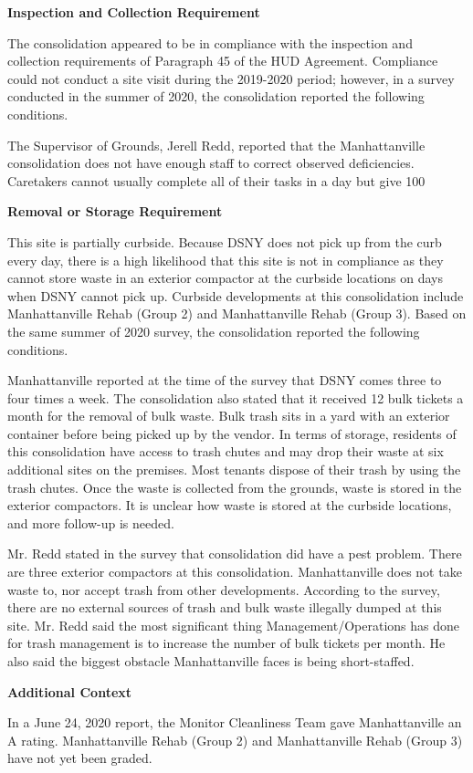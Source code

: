  

\textbf{Inspection and Collection Requirement} 

 

The consolidation appeared to be in compliance with the inspection and collection requirements of Paragraph 45 of the HUD Agreement. Compliance could not conduct a site visit during the 2019-2020 period; however, in a survey conducted in the summer of 2020, the consolidation reported the following conditions.

The Supervisor of Grounds, Jerell Redd, reported that the Manhattanville consolidation does not have enough staff to correct observed deficiencies. Caretakers cannot usually complete all of their tasks in a day but give 100%

\textbf{Removal or Storage Requirement}  

 

This site is partially curbside. Because DSNY does not pick up from the curb every day, there is a high likelihood that this site is not in compliance as they cannot store waste in an exterior compactor at the curbside locations on days when DSNY cannot pick up. Curbside developments at this consolidation include Manhattanville Rehab (Group 2) and  Manhattanville Rehab (Group 3).  Based on the same summer of  2020  survey, the consolidation reported the following conditions.

 

Manhattanville reported at the time of the survey that DSNY comes three to four times a week. The consolidation also stated that it received 12 bulk tickets a month for the removal of bulk waste. Bulk trash sits in a yard with an exterior container before being picked up by the vendor. In terms of storage, residents of this consolidation have access to trash chutes and may drop their waste at six additional sites on the premises.  Most tenants dispose of their trash by using the trash chutes. Once the waste is collected from the grounds, waste is stored in the exterior compactors. It is unclear how waste is stored at the curbside locations, and more follow-up is needed.

 

Mr. Redd stated in the survey that consolidation did have a pest problem. There are three exterior compactors at this consolidation. Manhattanville does not take waste to, nor accept trash from other developments. According to the survey, there are no external sources of trash and bulk waste illegally dumped at this site. Mr.  Redd said the most significant thing Management/Operations has done for trash management is to increase the number of bulk tickets per month. He also said the biggest obstacle Manhattanville faces is being short-staffed.

\textbf{Additional Context}  

In a June 24, 2020 report, the Monitor Cleanliness Team gave Manhattanville an A rating. Manhattanville Rehab (Group 2) and  Manhattanville Rehab (Group 3) have not yet been graded.

 